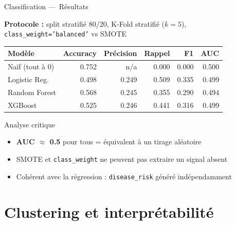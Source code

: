 \documentclass[12pt]{beamer}
\begin{document}
\begin{frame}{Classification ---~Résultats}

\small\textbf{Protocole :} split stratifié 80/20, K-Fold stratifié ($k=5$), \texttt{class\_weight='balanced'} vs SMOTE

\smallskip

\begin{center}
\small
\begin{tabular}{lrrrrr}
\toprule
Modèle & Accuracy & Précision & Rappel & F1 & AUC \\
\midrule
Naïf (tout à 0) & 0.752 & n/a   & 0.000 & 0.000 & 0.500 \\
Logistic Reg.   & 0.498 & 0.249 & 0.509 & 0.335 & 0.499 \\
Random Forest   & 0.568 & 0.245 & 0.355 & 0.290 & 0.494 \\
XGBoost         & 0.525 & 0.246 & 0.441 & 0.316 & 0.499 \\
\bottomrule
\end{tabular}
\end{center}

\smallskip

\normalsize
\begin{block}{Analyse critique}
\small
\begin{itemize}
  \item \textbf{AUC $\approx$ 0.5} pour tous = équivalent à un tirage aléatoire
  \item SMOTE et \texttt{class\_weight} ne peuvent pas extraire un signal absent
  \item Cohérent avec la régression : \texttt{disease\_risk} généré indépendamment
\end{itemize}
\end{block}

\end{frame}

\section{Clustering et interprétabilité}
\end{document}
